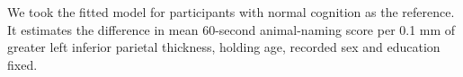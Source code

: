 \documentclass[11pt]{article}
\begin{document}
\par
\vspace{3mm}
We took the fitted model for \FinalN{} participants with normal cognition as the reference. It estimates the difference in mean 60-second animal-naming score per 0.1 mm of greater left inferior parietal thickness, holding age, recorded sex and education fixed.

\end{document}
